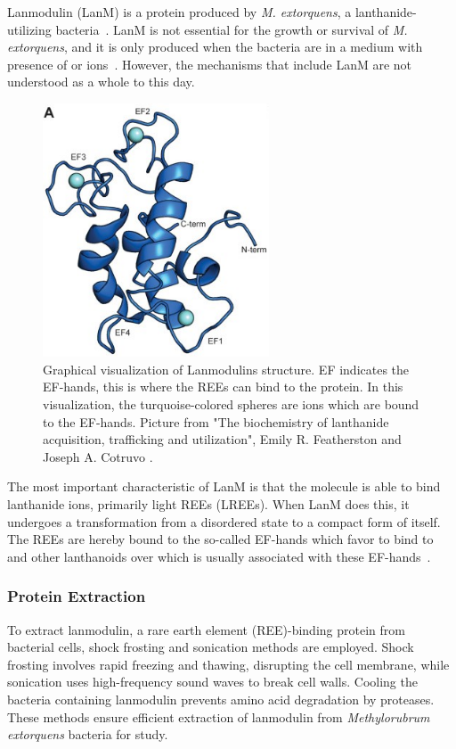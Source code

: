 Lanmodulin (LanM) is a protein produced by \textit{M. extorquens}, a lanthanide-utilizing bacteria~\cite{lanmdiscovery}.
LanM is not essential for the growth or survival of \textit{M. extorquens}, and it is only produced when the bacteria are in a medium with presence of  or  ions~\cite{lanmroleinbiology}.
However, the mechanisms that include LanM are not understood as a whole to this day.

\begin{figure}[H]
    \centering
    \includegraphics[width=0.6\textwidth]{./media/images/lanm_structure}
    \caption{Graphical visualization of Lanmodulins structure. EF indicates the EF-hands, this is where the REEs can bind to the protein. In this visualization, the turquoise-colored spheres are  ions which are bound to the EF-hands. Picture from "The biochemistry of lanthanide acquisition, trafficking and utilization", Emily R. Featherston and Joseph A. Cotruvo \cite{lanmroleinbiology}.}
    \label{fig:lanm_structure}
\end{figure}

The most important characteristic of LanM is that the molecule is able to bind lanthanide ions, primarily light REEs (LREEs).
When LanM does this, it undergoes a transformation from a disordered state to a compact form of itself.
The REEs are hereby bound to the so-called EF-hands which favor to bind to  and other lanthanoids over  which is usually associated with these EF-hands~\cite{lanmstructure}.





\subsubsection{Protein Extraction\authorB{}}
To extract lanmodulin, a rare earth element (REE)-binding protein from bacterial cells, shock frosting and sonication methods are employed.
Shock frosting involves rapid freezing and thawing, disrupting the cell membrane, while sonication uses high-frequency sound waves to break cell walls.
Cooling the bacteria containing lanmodulin prevents amino acid degradation by proteases.
These methods ensure efficient extraction of lanmodulin from \emph{Methylorubrum extorquens} bacteria for study.

